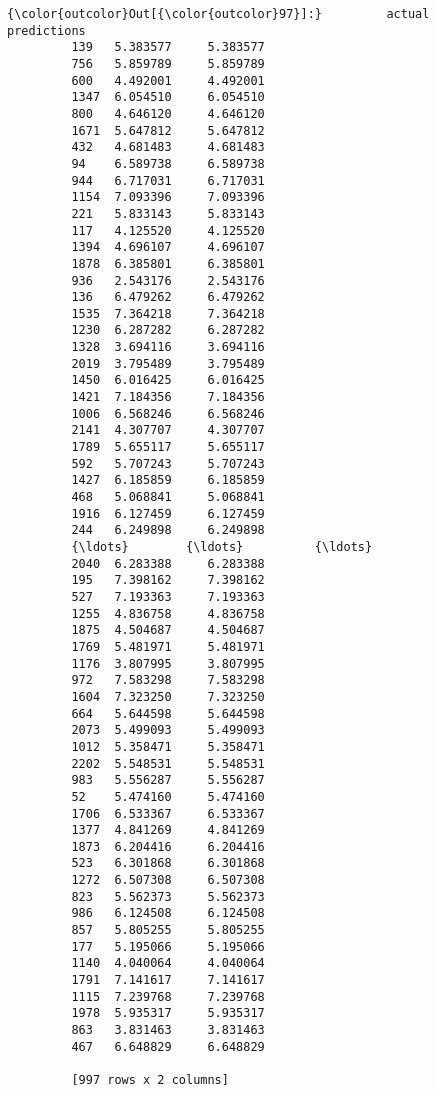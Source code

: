 \documentclass[11pt]{llncs}
\begin{document}
\begin{Verbatim}[commandchars=\\\{\}]
{\color{outcolor}Out[{\color{outcolor}97}]:}         actual  predictions
         139   5.383577     5.383577
         756   5.859789     5.859789
         600   4.492001     4.492001
         1347  6.054510     6.054510
         800   4.646120     4.646120
         1671  5.647812     5.647812
         432   4.681483     4.681483
         94    6.589738     6.589738
         944   6.717031     6.717031
         1154  7.093396     7.093396
         221   5.833143     5.833143
         117   4.125520     4.125520
         1394  4.696107     4.696107
         1878  6.385801     6.385801
         936   2.543176     2.543176
         136   6.479262     6.479262
         1535  7.364218     7.364218
         1230  6.287282     6.287282
         1328  3.694116     3.694116
         2019  3.795489     3.795489
         1450  6.016425     6.016425
         1421  7.184356     7.184356
         1006  6.568246     6.568246
         2141  4.307707     4.307707
         1789  5.655117     5.655117
         592   5.707243     5.707243
         1427  6.185859     6.185859
         468   5.068841     5.068841
         1916  6.127459     6.127459
         244   6.249898     6.249898
         {\ldots}        {\ldots}          {\ldots}
         2040  6.283388     6.283388
         195   7.398162     7.398162
         527   7.193363     7.193363
         1255  4.836758     4.836758
         1875  4.504687     4.504687
         1769  5.481971     5.481971
         1176  3.807995     3.807995
         972   7.583298     7.583298
         1604  7.323250     7.323250
         664   5.644598     5.644598
         2073  5.499093     5.499093
         1012  5.358471     5.358471
         2202  5.548531     5.548531
         983   5.556287     5.556287
         52    5.474160     5.474160
         1706  6.533367     6.533367
         1377  4.841269     4.841269
         1873  6.204416     6.204416
         523   6.301868     6.301868
         1272  6.507308     6.507308
         823   5.562373     5.562373
         986   6.124508     6.124508
         857   5.805255     5.805255
         177   5.195066     5.195066
         1140  4.040064     4.040064
         1791  7.141617     7.141617
         1115  7.239768     7.239768
         1978  5.935317     5.935317
         863   3.831463     3.831463
         467   6.648829     6.648829
         
         [997 rows x 2 columns]
\end{Verbatim}
            
\end{document}
